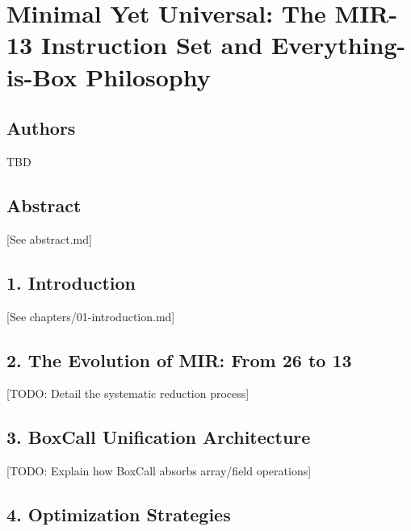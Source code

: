 \documentclass[
]{article}
\author{}
\date{}
\begin{document}
\hypertarget{minimal-yet-universal-the-mir-13-instruction-set-and-everything-is-box-philosophy}{%
\section{Minimal Yet Universal: The MIR-13 Instruction Set and
Everything-is-Box
Philosophy}\label{minimal-yet-universal-the-mir-13-instruction-set-and-everything-is-box-philosophy}}

\hypertarget{authors}{%
\subsection{Authors}\label{authors}}

TBD

\hypertarget{abstract}{%
\subsection{Abstract}\label{abstract}}

{[}See abstract.md{]}

\hypertarget{introduction}{%
\subsection{1. Introduction}\label{introduction}}

{[}See chapters/01-introduction.md{]}

\hypertarget{the-evolution-of-mir-from-26-to-13}{%
\subsection{2. The Evolution of MIR: From 26 to
13}\label{the-evolution-of-mir-from-26-to-13}}

{[}TODO: Detail the systematic reduction process{]}

\hypertarget{boxcall-unification-architecture}{%
\subsection{3. BoxCall Unification
Architecture}\label{boxcall-unification-architecture}}

{[}TODO: Explain how BoxCall absorbs array/field operations{]}

\hypertarget{optimization-strategies}{%
\subsection{4. Optimization Strategies}\label{optimization-strategies}}
\end{document}
